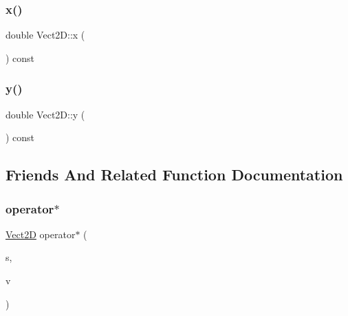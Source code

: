 \mbox{\label{classVect2D_a5ec56ffcb57f5dc61cb24a8672bfa196_a5ec56ffcb57f5dc61cb24a8672bfa196}} 
\subsubsection{\texorpdfstring{x()}{x()}}
{\footnotesize\ttfamily double Vect2\+D\+::x (\begin{DoxyParamCaption}{ }\end{DoxyParamCaption}) const}

\mbox{\label{classVect2D_ad0ca2a82c313cfa471e0339bafc635e9_ad0ca2a82c313cfa471e0339bafc635e9}} 
\subsubsection{\texorpdfstring{y()}{y()}}
{\footnotesize\ttfamily double Vect2\+D\+::y (\begin{DoxyParamCaption}{ }\end{DoxyParamCaption}) const}



\subsection{Friends And Related Function Documentation}
\mbox{\label{classVect2D_a48631d6a1c75eb08d287e3c4c4e3c95e_a48631d6a1c75eb08d287e3c4c4e3c95e}} 
\subsubsection{\texorpdfstring{operator$\ast$}{operator*}}
{\footnotesize\ttfamily \hyperlink{classVect2D}{Vect2D} operator$\ast$ (\begin{DoxyParamCaption}\item[{double}]{s,  }\item[{const \hyperlink{classVect2D}{Vect2D} \&}]{v }\end{DoxyParamCaption})\hspace{0.3cm}{\ttfamily [friend]}}

